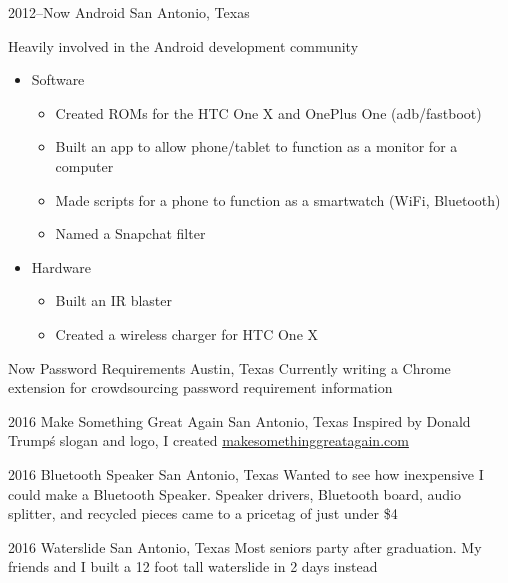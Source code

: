 \documentclass[]{friggeri-cv} %
\begin{document}
\begin{entrylist}

	\entry
	{2012--Now}
	{Android}
	{San Antonio, Texas}
	{Heavily involved in the Android development community
		\begin{itemize}
			\item Software
				\begin{itemize}
					\item Created ROMs for the HTC One X and OnePlus One (adb/fastboot)
					\item Built an app to allow phone/tablet to function as a  monitor for a computer
					\item Made scripts for a phone to function as a smartwatch (WiFi, Bluetooth)
					\item Named a Snapchat filter
				\end{itemize}
			\item Hardware
				\begin{itemize}
					\item Built an IR blaster
					\item Created a wireless charger for HTC One X
				\end{itemize}
		\end{itemize}
	}


	\entry
	{Now}
	{Password Requirements}
	{Austin, Texas}
	{Currently writing a Chrome extension for crowdsourcing password requirement information}


	\entry
	{2016}
	{Make Something Great Again}
	{San Antonio, Texas}
	{Inspired by Donald Trump\'s slogan and logo, I created \href{http://makesomethinggreatagain.com}{makesomethinggreatagain.com}}


	\entry
	{2016}
	{Bluetooth Speaker}
	{San Antonio, Texas}
	{Wanted to see how inexpensive I could make a Bluetooth Speaker. Speaker drivers, Bluetooth board, audio splitter, and recycled pieces came to a pricetag of just under \$4}


	\entry
	{2016}
	{Waterslide}
	{San Antonio, Texas}
	{Most seniors party after graduation. My friends and I built a 12 foot tall waterslide in 2 days instead}



\end{entrylist}
\end{document}
